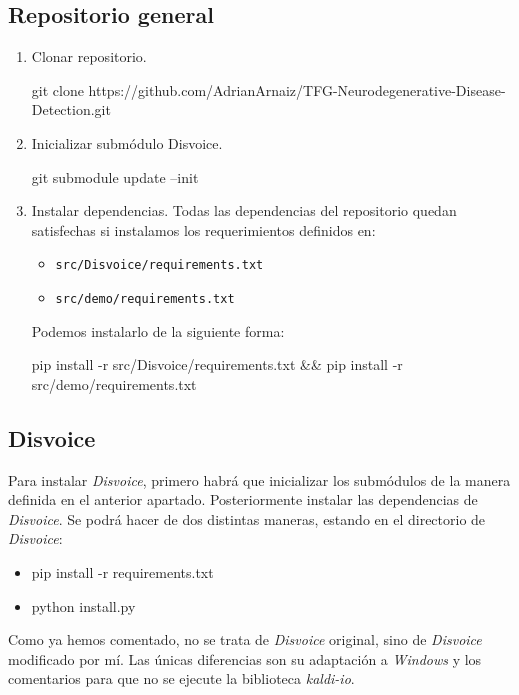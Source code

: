 \subsection{Repositorio general} 
\begin{enumerate}
\item Clonar repositorio. 
\begin{center}
git clone https://github.com/AdrianArnaiz/TFG-Neurodegenerative-Disease-Detection.git
\end{center}
\item Inicializar submódulo Disvoice. 
\begin{center}
git submodule update --init
\end{center}
\item Instalar dependencias. Todas las dependencias del repositorio quedan satisfechas si instalamos los requerimientos definidos en:
\begin{itemize}
\item \texttt{src/Disvoice/requirements.txt}
\item \texttt{src/demo/requirements.txt}
\end{itemize} 
Podemos instalarlo de la siguiente forma:
\begin{center}
pip install -r src/Disvoice/requirements.txt \&\& pip install -r src/demo/requirements.txt
\end{center}

\end{enumerate}

\subsection{Disvoice} 
Para instalar \textit{Disvoice}, primero habrá que inicializar los submódulos de la manera definida en el anterior apartado.
Posteriormente instalar las dependencias de \textit{Disvoice}. Se podrá hacer de dos distintas maneras, estando en el directorio de \textit{Disvoice}:
\begin{itemize}
\item \begin{center}
pip install -r requirements.txt
\end{center}
\item \begin{center}
python install.py
\end{center}
\end{itemize}

Como ya hemos comentado, no se trata de \textit{Disvoice} original, sino de \textit{Disvoice} modificado por mí. Las únicas diferencias son su adaptación a \textit{Windows} y los comentarios para que no se ejecute la biblioteca \textit{kaldi-io}.


